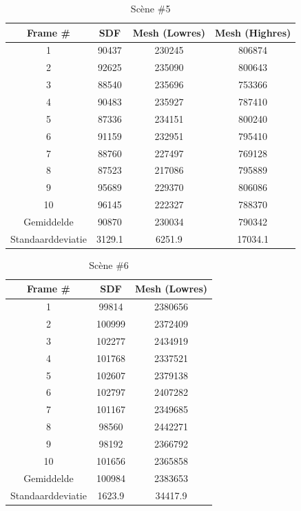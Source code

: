 \documentclass[12pt, a4paper]{article}
\begin{document}
\begin{table}[H]
\centering
\begin{tabular}{| c | c c c |}
	\hline
	Frame \# & SDF & Mesh (Lowres) & Mesh (Highres) \\
	\hline
	1 &90437 &230245 &806874 \\
	2 &92625 &235090 &800643 \\
	3 &88540 &235696 &753366 \\
	4 &90483 &235927 &787410 \\
	5 &87336 &234151 &800240 \\
	6 &91159 &232951 &795410 \\
	7 &88760 &227497 &769128 \\
	8 &87523 &217086 &795889 \\
	9 &95689 &229370 &806086 \\
	10 &96145 &222327 &788370 \\
	\hline
	Gemiddelde &90870 &230034 &790342 \\
	Standaarddeviatie &3129.1 &6251.9 &17034.1 \\
	\hline
\end{tabular}
\caption{Scène \#5}
\end{table}
\begin{table}[H]
\centering
\begin{tabular}{| c | c c |}
	\hline
	Frame \# & SDF & Mesh (Lowres) \\
	\hline
	1 &99814 &2380656 \\
	2 &100999 &2372409 \\
	3 &102277 &2434919 \\
	4 &101768 &2337521 \\
	5 &102607 &2379138 \\
	6 &102797 &2407282 \\
	7 &101167 &2349685 \\
	8 &98560 &2442271 \\
	9 &98192 &2366792 \\
	10 &101656 &2365858 \\
	\hline
	Gemiddelde &100984 &2383653 \\
	Standaarddeviatie &1623.9 &34417.9 \\
	\hline
\end{tabular}
\caption{Scène \#6}
\end{table}
\end{document}
